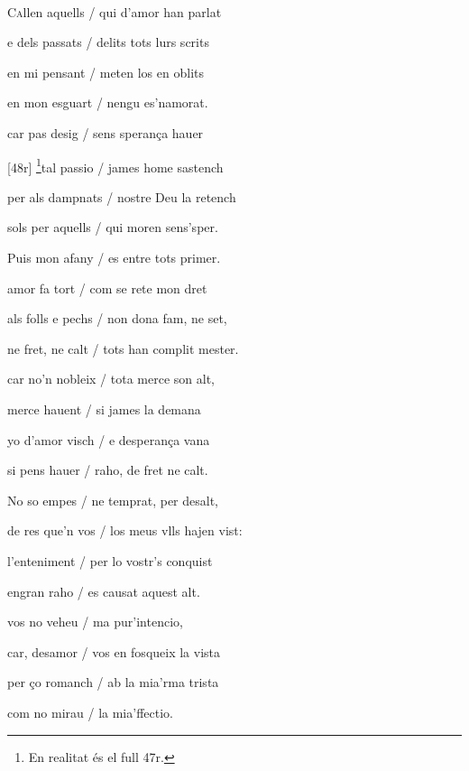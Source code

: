 \documentclass[12pt]{article}
\renewcommand{\espaiAbansEtiquetaPoema}{\vspace{0ex}}
\begin{document}
\begin{estrofa}

\espaiAbansEtiquetaPoema

\\

\end{estrofa}


\begin{estrofa}

 C\textsc{a}llen aquells / qui d'amor han parlat

 e dels passats / delits tots lurs scrits

 en mi pensant / meten los en oblits

 en mon esguart / nengu es'namorat.

 car pas desig / sens speran\c{c}a hauer

 [48r] \footnote{En realitat \'{e}s el full 47r.}tal passio / james home sastench

 per als dampnats / nostre Deu la retench

 sols per aquells / qui moren sens'sper.

\end{estrofa}



\begin{estrofa}

 Puis mon afany / es entre tots primer.

 amor fa tort / com se rete mon dret

 als folls e pechs / non dona fam, ne set,

 ne fret, ne calt / tots han complit mester.

 car no'n nobleix / tota merce son alt,

 merce hauent / si james la demana

 yo d'amor visch / e desperan\c{c}a vana

 si pens hauer / raho, de fret ne calt.

\end{estrofa}



\begin{estrofa}

 No so empes / ne temprat, per desalt,

 de res que'n vos / los meus vlls hajen vist:

 l'enteniment / per lo vostr's conquist

 engran raho / es causat aquest alt.

 vos no veheu / ma pur'intencio,

 car, desamor / vos en fosqueix la vista

 per \c{c}o romanch / ab la mia'rma trista

 com no mirau / la mia'ffectio.

\end{estrofa}
\end{document}
